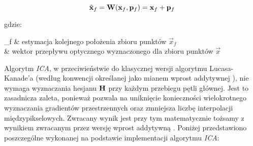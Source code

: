 \begin{equation}
\label{equ:Modul_Lucas_Kanade_sledzenie}	
	 \hat{\mathbf{x}}_f = \mathbf{W}(\mathbf{x}_f, \mathbf{p}_f) = \mathbf{x}_ f+ \mathbf{p}_f 
\end{equation}

\noindent
gdzie:
\begin{conditions}
	 _f & estymacja kolejnego położenia zbioru punktów $\vec{x}_f$  \\
	  & wektor przepływu optycznego wyznaczonego dla zbioru punktów $\vec{x}$ \\
\end{conditions}

Algorytm \textit{ICA}, w przeciwieństwie do klasycznej wersji algorytmu Lucasa-Kanade'a (według konwencji określanej jako mianem wprost addytywnej \cite{Baker2004}), nie wymaga wyznaczania hesjanu $\mathbf{H}$ przy każdym przebiegu pętli głównej. Jest to zasadnicza zaleta, ponieważ pozwala na uniknięcie konieczności wielokrotnego wyznaczania gradientów przestrzennych oraz zmniejsza liczbę interpolacji międzypikselowych. Zwracany wynik jest przy tym matematycznie tożsamy z wynikiem zwracanym przez wersję wprost addytywną \cite{Baker2004}. Poniżej przedstawiono poszczególne wykonanej na podstawie \cite{Baker2004} implementacji algorytmu \textit{ICA}:

